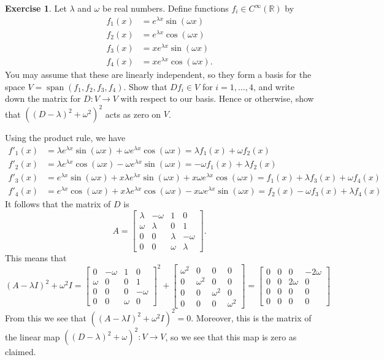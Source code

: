 \documentclass[a4paper]{amsart}
\newcommand{\R}         {{\mathbb{R}}}
\newcommand{\bpm}       {\left[\begin{matrix}}
\newcommand{\epm}       {\end{matrix}\right]}
\newcommand{\lm}        {\lambda}
\newcommand{\om}        {\omega}
\newcommand{\xra}       {\xrightarrow}
\newcommand{\spn}       {\operatorname{span}}
\renewcommand{\:}{\colon}
\theoremstyle{definition}
\newtheorem{exercise}{Exercise}
\newenvironment{solution}{{\noindent \bf Solution:}}{}
\begin{document}
\begin{exercise}
 Let $\lm$ and $\om$ be real numbers.  Define functions
 $f_i\in C^\infty(\R)$ by
 \begin{align*}
  f_1(x) &= e^{\lm x}\sin(\om x) \\
  f_2(x) &= e^{\lm x}\cos(\om x) \\
  f_3(x) &= x e^{\lm x}\sin(\om x) \\
  f_4(x) &= x e^{\lm x}\cos(\om x).
 \end{align*}
 You may assume that these are linearly independent, so they
 form a basis for the space $V=\spn(f_1,f_2,f_3,f_4)$.  Show
 that $Df_i\in V$ for $i=1,\dotsc,4$, and write down the
 matrix for $D\:V\xra{}V$ with respect to our basis.  Hence
 or otherwise, show that $((D-\lm)^2+\om^2)^2$ acts as zero
 on $V$.
\end{exercise}
\begin{solution}
 Using the product rule, we have
 \begin{align*}
  f'_1(x) &=
   \lm e^{\lm x}\sin(\om x) + \om e^{\lm x}\cos(\om x) =
   \lm f_1(x) + \om f_2(x) \\
  f'_2(x) &= 
   \lm e^{\lm x}\cos(\om x) - \om e^{\lm x}\sin(\om x) =
   -\om f_1(x) + \lm f_2(x) \\
  f'_3(x) &= 
   e^{\lm x}\sin(\om x) + x \lm e^{\lm x}\sin(\om x) + x \om e^{\lm x}\cos(\om x) =
   f_1(x) + \lm f_3(x) + \om f_4(x) \\
  f'_4(x) &= 
   e^{\lm x}\cos(\om x) + x \lm e^{\lm x}\cos(\om x) - x \om e^{\lm x}\sin(\om x) =
   f_2(x) - \om f_3(x) + \lm f_4(x)   
 \end{align*}
 It follows that the matrix of $D$ is
 \[ A = \bpm \lm & -\om &  1  &   0  \\
             \om &  \lm &  0  &   1  \\
              0  &   0  & \lm & -\om \\
              0  &   0  & \om &  \lm \epm.
 \]
 This means that 
 \[ (A-\lm I)^2 + \om^2 I = 
    \bpm  0  & -\om &  1  &   0  \\
         \om &   0  &  0  &   1  \\
          0  &   0  &  0  & -\om \\
          0  &   0  & \om &   0 \epm^2 + 
    \bpm \om^2 & 0 & 0 & 0 \\ 0 & \om^2 & 0 & 0 \\
         0 & 0 & \om^2 & 0 \\ 0 & 0 & 0 & \om^2 \epm = 
    \bpm 0&0&0& -2\om \\ 0&0&2\om &0 \\ 0&0&0&0 \\ 0&0&0&0\epm
 \]
 From this we see that $((A-\lm I)^2+\om^2I)^2=0$.
 Moreover, this is the matrix of the linear map
 $((D-\lm)^2+\om)^2\:V\to V$, so we see that this map
 is zero as claimed.
\end{solution}
\end{document}
